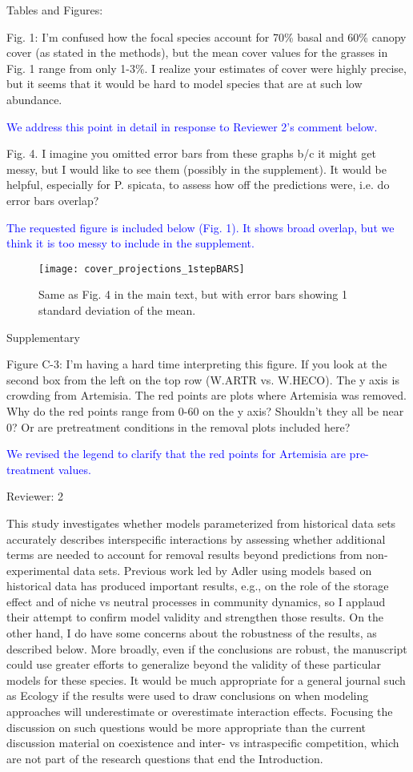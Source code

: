 \documentclass[12pt]{article}
\newcommand{\response}{\textcolor{blue}}
\begin{document}
Tables and Figures:

Fig. 1: I’m confused how the focal species account for 70\% basal and 60\% canopy cover (as stated in the methods), but the mean cover values for the grasses in Fig. 1 range from only 1-3\%. I realize your estimates of cover were highly precise, but it seems that it would be hard to model species that are at such low abundance.

\response{We address this point in detail in response to Reviewer 2's comment below.}

Fig. 4. I imagine you omitted error bars from these graphs b/c it might get messy, but I would like to see them (possibly in the supplement). It would be helpful, especially for P. spicata, to assess how off the predictions were, i.e. do error bars overlap?

\response{The requested figure is included below (Fig. 1). It shows broad overlap, but we think it is too messy to include in the supplement. }

 \begin{figure}[tbp]
 \centering
 \texttt{[image: cover\_projections\_1stepBARS]}
 \caption{ Same as Fig. 4 in the main text, but with error bars showing 1 standard deviation of the mean. }
 \label{fig:projectionsBars}
 \end{figure}

Supplementary

Figure C-3: I’m having a hard time interpreting this figure. If you look at the second box from the left on the top row (W.ARTR vs. W.HECO). The y axis is crowding from Artemisia. The red points are plots where Artemisia was removed. Why do the red points range from 0-60 on the y axis? Shouldn't they all be near 0? Or are pretreatment conditions in the removal plots included here? 

\response{We revised the legend to clarify that the red points for Artemisia are pre-treatment values.}

Reviewer: 2

This study investigates whether models parameterized from historical data sets accurately describes
interspecific interactions by assessing whether additional terms are needed to account for removal
results beyond predictions from non-experimental data sets. Previous work led by Adler using models
based on historical data has produced important results, e.g., on the role of the storage effect and of
niche vs neutral processes in community dynamics, so I applaud their attempt to confirm model validity
and strengthen those results. On the other hand, I do have some concerns about the robustness of the
results, as described below. More broadly, even if the conclusions are robust, the manuscript could use
greater efforts to generalize beyond the validity of these particular models for these species. It would
be much appropriate for a general journal such as Ecology if the results were used to draw conclusions
on when modeling approaches will underestimate or overestimate interaction effects. Focusing the
discussion on such questions would be more appropriate than the current discussion material on
coexistence and inter- vs intraspecific competition, which are not part of the research questions that
end the Introduction.
\end{document}
